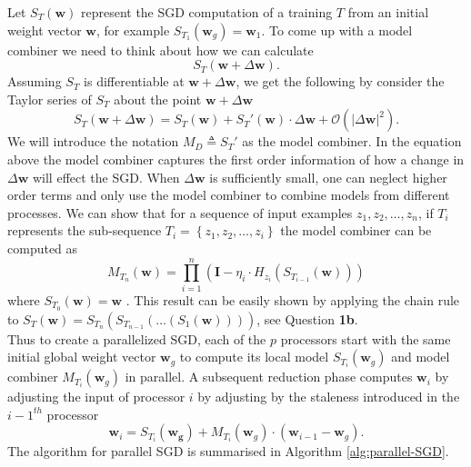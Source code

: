 Let $S_{T} \left( \bm{w} \right)$ represent the SGD computation of a training $T$ from an initial weight vector $\bm{w}$, for example $S_{T_{1}} \left( \bm{w}_{g} \right) = \bm{w}_{1}$. To come up with a model combiner we need to think about how we can calculate
\[
    S_{T} \left( \bm{w} + \Delta \bm{w} \right).
\]
Assuming $S_{T}$ is differentiable at $\bm{w} + \Delta \bm{w}$, we get the following by consider the Taylor series of $S_{T}$ about the point $\bm{w} + \Delta \bm{w}$
\[
    S_{T} \left( \bm{w} + \Delta \bm{w} \right) = S_{T} \left( \bm{w} \right) + S_{T} ' \left( \bm{w} \right) \cdot \Delta \bm{w} + \mathcal{O} \left( \left| \Delta \bm{w} \right|^{2} \right).
\]
We will introduce the notation $M_{D} \triangleq S_{T}'$ as the model combiner. In the equation above the model combiner captures the first order information of how a change in $\Delta \bm{w}$ will effect the SGD. When $\Delta \bm{w}$ is sufficiently small, one can neglect higher order terms and only use the model combiner to combine models from different processes. We can show that for a sequence of input examples $z_1 , z_2, \ldots , z_{n}$, if $T_{i}$ represents the sub-sequence $T_{i} = \left\{ z_1 , z_2, \ldots , z_{i} \right\}$ the model combiner can be computed as
\[
    M_{T_{n}} (\bm{w}) = \prod_{i=1}^{n} \left( \bm{I} - \eta_{i} \cdot H_{z_{i}} \left( S_{T_{i-1}} \left( \bm{w} \right) \right) \right)
\]
where $S_{T_{0}} \left( \bm{w} \right) = \bm{w}$ \cite{MalekiSaeed2017PSGD}. This result can be easily shown by applying the chain rule to $S_{T} \left( \bm{w} \right) = S_{T_{n}} \left( S_{T_{n-1}} \left( \ldots \left( S_{1} \left( \bm{w} \right) \right) \right) \right)$, see Question \textbf{1b}.\\[1\baselineskip]
Thus to create a parallelized SGD, each of the $p$ processors start with the same initial global weight vector $\bm{w}_{g}$ to compute its local model $S_{T_i} \left( \bm{w}_{g} \right)$ and model combiner $M_{T_{i}} \left( \bm{w}_{g} \right)$ in parallel. A subsequent reduction phase computes $\bm{w}_{i}$ by adjusting the input of processor $i$ by adjusting by the staleness introduced in the ${i-1}^{th}$ processor
\[
    \bm{w}_{i} = S_{T_{i}} \left( \bm{w_{g}} \right) + M_{T_{i}} \left( \bm{w}_{g} \right) \cdot \left( \bm{w}_{i-1} - \bm{w}_{g} \right).
\]
The algorithm for parallel SGD is summarised in Algorithm \ref{alg:parallel-SGD}.

